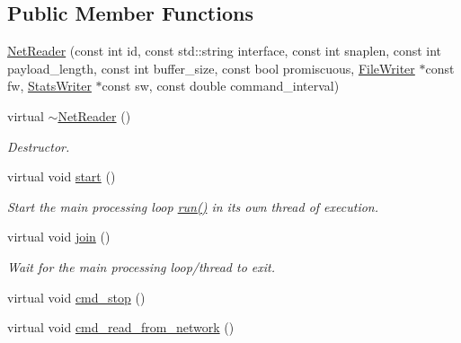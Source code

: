 \subsection*{Public Member Functions}
\begin{DoxyCompactItemize}
\item 
\hyperlink{class_net_reader_adadbce06c16a6350aba08f468a7b0d83}{NetReader} (const int id, const std::string interface, const int snaplen, const int payload\_\-length, const int buffer\_\-size, const bool promiscuous, \hyperlink{class_file_writer}{FileWriter} $\ast$const fw, \hyperlink{class_stats_writer}{StatsWriter} $\ast$const sw, const double command\_\-interval)
\item 
\hypertarget{class_net_reader_a87d8aa64164c1f55ad34dc3c1b362559}{
virtual \hyperlink{class_net_reader_a87d8aa64164c1f55ad34dc3c1b362559}{$\sim$NetReader} ()}
\label{class_net_reader_a87d8aa64164c1f55ad34dc3c1b362559}

\begin{DoxyCompactList}\small\item\em Destructor. \end{DoxyCompactList}\item 
\hypertarget{class_net_reader_aa3d94d0ddcddacb2985046934fa1006e}{
virtual void \hyperlink{class_net_reader_aa3d94d0ddcddacb2985046934fa1006e}{start} ()}
\label{class_net_reader_aa3d94d0ddcddacb2985046934fa1006e}

\begin{DoxyCompactList}\small\item\em Start the main processing loop \hyperlink{class_net_reader_af770f94a75655fc02489c9cb1f778181}{run()} in its own thread of execution. \end{DoxyCompactList}\item 
\hypertarget{class_net_reader_a4eb2447a323f7068b3838418bf746854}{
virtual void \hyperlink{class_net_reader_a4eb2447a323f7068b3838418bf746854}{join} ()}
\label{class_net_reader_a4eb2447a323f7068b3838418bf746854}

\begin{DoxyCompactList}\small\item\em Wait for the main processing loop/thread to exit. \end{DoxyCompactList}\item 
virtual void \hyperlink{class_net_reader_a8ba627314d064cb636f192974e4daed6}{cmd\_\-stop} ()
\item 
virtual void \hyperlink{class_net_reader_a47c2209376226353e4c5d80c4f35713f}{cmd\_\-read\_\-from\_\-network} ()
\end{DoxyCompactItemize}
